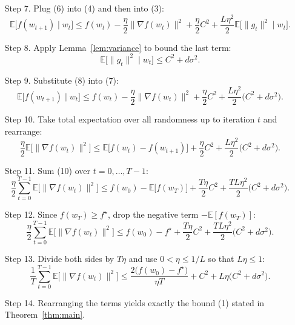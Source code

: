 \documentclass{article}
\newcommand{\E}{\mathbb{E}}
\begin{document}
\begin{enumerate}
\item[Step 7.] Plug (6) into (4) and then into (3):
\[
\E\!\bigl[f(w_{t+1})\mid w_t\bigr]
\le f(w_t)-\frac{\eta}{2}\|\nabla f(w_t)\|^{2}
+\frac{\eta}{2}C^{2}
+\frac{L\eta^{2}}{2}\E\!\bigl[\|g_t\|^{2}\mid w_t\bigr].
\tag{7}
\]

\item[Step 8.] Apply Lemma~\ref{lem:variance} to bound the last term:
\[
\E\!\bigl[\|g_t\|^{2}\mid w_t\bigr]\le C^{2}+d\sigma^{2}.
\tag{8}
\]

\item[Step 9.] Substitute (8) into (7):
\[
\E\!\bigl[f(w_{t+1})\mid w_t\bigr]
\le f(w_t)-\frac{\eta}{2}\|\nabla f(w_t)\|^{2}
+\frac{\eta}{2}C^{2}
+\frac{L\eta^{2}}{2}\bigl(C^{2}+d\sigma^{2}\bigr).
\tag{9}
\]

\item[Step 10.] Take total expectation over all randomness up to iteration $t$ and rearrange:
\[
\frac{\eta}{2}\E\!\bigl[\|\nabla f(w_t)\|^{2}\bigr]
\le \E\!\bigl[f(w_t)-f(w_{t+1})\bigr]
+\frac{\eta}{2}C^{2}
+\frac{L\eta^{2}}{2}\bigl(C^{2}+d\sigma^{2}\bigr).
\tag{10}
\]

\item[Step 11.] Sum (10) over $t=0,\dots,T-1$:
\[
\frac{\eta}{2}\sum_{t=0}^{T-1}\E\!\bigl[\|\nabla f(w_t)\|^{2}\bigr]
\le f(w_0)-\E\!\bigl[f(w_T)\bigr]
+\frac{T\eta}{2}C^{2}
+\frac{TL\eta^{2}}{2}\bigl(C^{2}+d\sigma^{2}\bigr).
\tag{11}
\]

\item[Step 12.] Since $f(w_T)\ge f^\star$, drop the negative term $-\E[f(w_T)]$:
\[
\frac{\eta}{2}\sum_{t=0}^{T-1}\E\!\bigl[\|\nabla f(w_t)\|^{2}\bigr]
\le f(w_0)-f^\star
+\frac{T\eta}{2}C^{2}
+\frac{TL\eta^{2}}{2}\bigl(C^{2}+d\sigma^{2}\bigr).
\tag{12}
\]

\item[Step 13.] Divide both sides by $T\eta$ and use $0<\eta\le 1/L$ so that $L\eta\le 1$:
\[
\frac{1}{T}\sum_{t=0}^{T-1}\E\!\bigl[\|\nabla f(w_t)\|^{2}\bigr]
\le \frac{2\bigl(f(w_0)-f^\star\bigr)}{\eta T}
+ C^{2}
+ L\eta\bigl(C^{2}+d\sigma^{2}\bigr).
\tag{13}
\]

\item[Step 14.] Rearranging the terms yields exactly the bound (1) stated in Theorem~\ref{thm:main}.
\end{enumerate}
\end{document}
